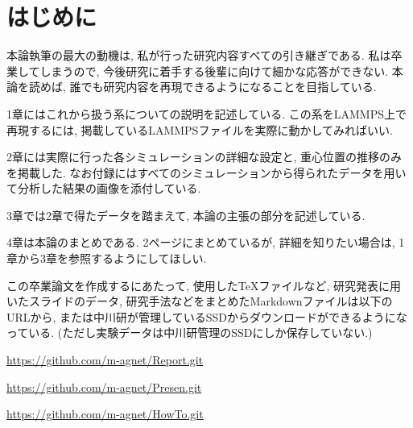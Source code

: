 \chapter*{はじめに}

本論執筆の最大の動機は, 私が行った研究内容すべての引き継ぎである. 私は卒業してしまうので, 今後研究に着手する後輩に向けて細かな応答ができない. 本論を読めば, 誰でも研究内容を再現できるようになることを目指している. 

1章にはこれから扱う系についての説明を記述している. この系をLAMMPS上で再現するには, 掲載しているLAMMPSファイルを実際に動かしてみればいい. 

2章には実際に行った各シミュレーションの詳細な設定と, 重心位置の推移のみを掲載した. なお付録にはすべてのシミュレーションから得られたデータを用いて分析した結果の画像を添付している. 

3章では2章で得たデータを踏まえて, 本論の主張の部分を記述している. 

4章は本論のまとめである. 2ページにまとめているが, 詳細を知りたい場合は, 1章から3章を参照するようにしてほしい. 

この卒業論文を作成するにあたって, 使用した\TeX ファイルなど, 研究発表に用いたスライドのデータ, 研究手法などをまとめたMarkdownファイルは以下のURLから, または中川研が管理しているSSDからダウンロードができるようになっている. (ただし実験データは中川研管理のSSDにしか保存していない.)

\href{https://github.com/m-agnet/Report.git}{https://github.com/m-agnet/Report.git}

\href{https://github.com/m-agnet/Presen.git}{https://github.com/m-agnet/Presen.git}

\href{https://github.com/m-agnet/HowTo.git}{https://github.com/m-agnet/HowTo.git}